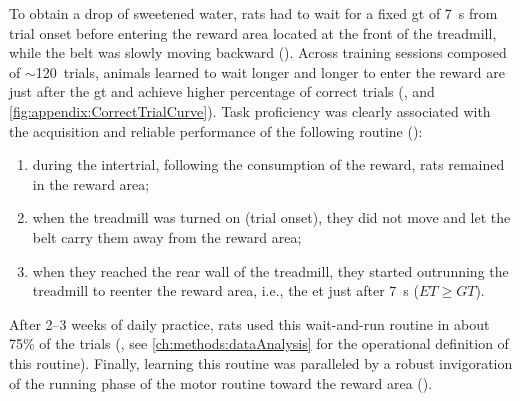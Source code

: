 To obtain a drop of sweetened water, rats had to wait for a fixed \gls{gt} of 7~s from trial onset before entering the reward area located at the front of the treadmill, while the belt was slowly moving backward ().
Across training sessions composed of $\sim$120~trials, animals learned to wait longer and longer to enter the reward are just after the \gls{gt} and achieve higher percentage of correct trials (, and \autoref{fig:appendix:CorrectTrialCurve}).
Task proficiency was clearly associated with the acquisition and reliable performance of the following routine ():
\begin{enumerate}[noitemsep, label=\Roman*.]
    \item during the intertrial, following the consumption of the reward, rats remained in the reward area;
    \item when the treadmill was turned on (trial onset), they did not move and let the belt carry them away from the reward area;
    \item when they reached the rear wall of the treadmill, they started outrunning the treadmill to reenter the reward area, i.e., the \gls{et} just after 7~s ($ET\geq GT$).
\end{enumerate}
After 2--3 weeks of daily practice, rats used this wait-and-run routine in about 75\% of the trials (, see \autoref{ch:methods:dataAnalysis} for the operational definition of this routine).
Finally, learning this routine was paralleled by a robust invigoration of the running phase of the motor routine toward the reward area ().


